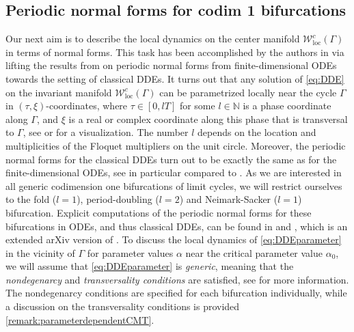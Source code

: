 \documentclass[english]{myarticle}
\DeclareMathOperator{\loc}{loc}
\begin{document}
\begin{sloppypar}
\subsection{Periodic normal forms for codim 1 bifurcations} \label{subsec:periodic normal forms}
Our next aim is to describe the local dynamics on the center manifold $\mathcal{W}_{\loc}^{c}(\Gamma)$ in terms of normal forms. This task has been accomplished by the authors in \cite{Article2} via lifting the results from \cite{Iooss1988,Iooss1999} on periodic normal forms from finite-dimensional ODEs towards the setting of classical DDEs. It turns out that any solution of \eqref{eq:DDE} on the invariant manifold $\mathcal{W}_{\loc}^{c}(\Gamma)$ can be parametrized locally near the cycle $\Gamma$ in $(\tau,\xi)$-coordinates, where $\tau \in [0,lT]$ for some $l \in \mathbb{N}$ is a phase coordinate along $\Gamma$, and $\xi$ is a real or complex coordinate along this phase that is transversal to $\Gamma$, see \cite[Figure 1]{Article2} or \cite[Figure 5.18 and 5.20]{Kuznetsov2023a} for a visualization. The number $l$ depends on the location and multiplicities of the Floquet multipliers on the unit circle. Moreover, the periodic normal forms for the classical DDEs turn out to be exactly the same as for the finite-dimensional ODEs, see in particular \cite[Theorem 24, 25 and 26]{Article2} compared to \cite[Theorem III.7, III.10 and III.13]{Iooss1999}. As we are interested in all generic codimension one bifurcations of limit cycles, we will restrict ourselves to the fold ($l=1$), period-doubling ($l=2$) and Neimark-Sacker ($l=1$) 
bifurcation. Explicit computations of the periodic normal forms for these bifurcations in ODEs, and thus classical DDEs, can be found in \cite[Section III.2]{Iooss1999} and \cite[Appendix A]{DellaRossa2011}, which is an extended arXiv version of \cite{Witte2013}. To discuss the local dynamics of \eqref{eq:DDEparameter} in the vicinity of $\Gamma$ for parameter values $\alpha$ near the critical parameter value $\alpha_0$, we will assume that \eqref{eq:DDEparameter} is \emph{generic}, meaning that the \emph{nondegenarcy} and \emph{transversality conditions} are satisfied, see \cite[Section 2]{Kuznetsov2023a} for more information. The nondegenarcy conditions are specified for each bifurcation individually, while a discussion on the transversality conditions is provided \cref{remark:parameterdependentCMT}.


\end{sloppypar}
\end{document}
